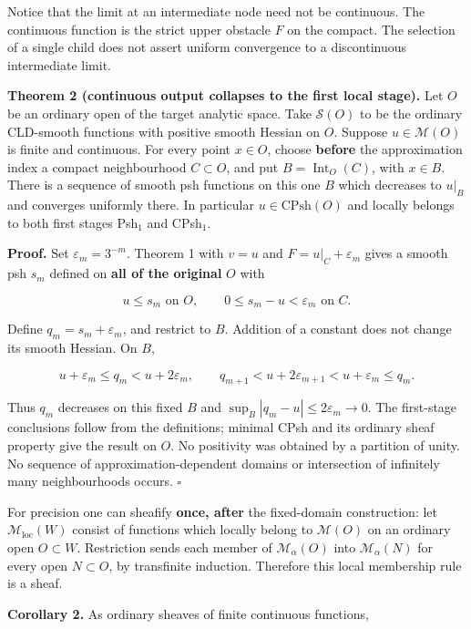 \documentclass[
  11pt,
]{article}
\begin{document}
Notice that the limit at an intermediate node need not be continuous.
The continuous function is the strict upper obstacle \(F\) on the
compact. The selection of a single child does not assert uniform
convergence to a discontinuous intermediate limit.

\textbf{Theorem 2 (continuous output collapses to the first local
stage).} Let \(O\) be an ordinary open of the target analytic space.
Take \(\mathcal S(O)\) to be the ordinary CLD-smooth functions with
positive smooth Hessian on \(O\). Suppose \(u\in\mathcal M(O)\) is
finite and continuous. For every point \(x\in O\), choose
\textbf{before} the approximation index a compact neighbourhood
\(C\subset O\), and put \(B=\operatorname{Int}_O(C)\), with \(x\in B\).
There is a sequence of smooth psh functions on this one \(B\) which
decreases to \(u|_B\) and converges uniformly there. In particular
\(u\in\mathrm{CPsh}(O)\) and locally belongs to both first stages
Psh\(_1\) and CPsh\(_1\).

\textbf{Proof.} Set \(\varepsilon_m=3^{-m}\). Theorem 1 with \(v=u\) and
\(F=u|_C+\varepsilon_m\) gives a smooth psh \(s_m\) defined on
\textbf{all of the original} \(O\) with

\[
u\leq s_m\text{ on }O,\qquad
0\leq s_m-u<\varepsilon_m\text{ on }C.
\]

Define \(q_m=s_m+\varepsilon_m\), and restrict to \(B\). Addition of a
constant does not change its smooth Hessian. On \(B\),

\[
u+\varepsilon_m\leq q_m<u+2\varepsilon_m,
\qquad
q_{m+1}<u+2\varepsilon_{m+1}
 <u+\varepsilon_m\leq q_m.
\]

Thus \(q_m\) decreases on this fixed \(B\) and
\(\sup_B|q_m-u|\leq2\varepsilon_m\to0\). The first-stage conclusions
follow from the definitions; minimal CPsh and its ordinary sheaf
property give the result on \(O\). No positivity was obtained by a
partition of unity. No sequence of approximation-dependent domains or
intersection of infinitely many neighbourhoods occurs. \(\square\)

For precision one can sheafify \textbf{once, after} the fixed-domain
construction: let \(\mathcal M_{\mathrm{loc}}(W)\) consist of functions
which locally belong to \(\mathcal M(O)\) on an ordinary open
\(O\subset W\). Restriction sends each member of \(\mathcal M_\alpha(O)\)
into \(\mathcal M_\alpha(N)\) for every open \(N\subset O\),
by transfinite induction. Therefore this
local membership rule is a sheaf.

\textbf{Corollary 2.} As ordinary sheaves of finite continuous
functions,
\end{document}
